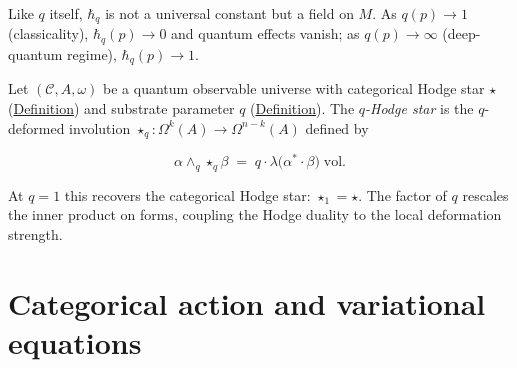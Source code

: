 \begin{remark}
  \label{rem:planck-limits}
Like $q$ itself, $\hbar_q$ is not a universal constant but a field on $M$.
As $q(p) \to 1$ (classicality), $\hbar_q(p) \to 0$ and quantum effects
vanish; as $q(p) \to \infty$ (deep-quantum regime), $\hbar_q(p) \to 1$.
\end{remark}

\begin{definition}
  \label{def:q-hodge-star}
Let $(\mathcal{C}, A, \omega)$ be a quantum observable universe with
categorical Hodge star $\star$
(\hyperref[def:categorical-hodge-star]{Definition}) and substrate
parameter $q$ (\hyperref[def:substrate-parameter]{Definition}).  The
\emph{$q$-Hodge star} is the $q$-deformed involution
$\star_q \colon \Omega^k(A) \to \Omega^{n-k}(A)$ defined by

\[
\alpha \wedge_q \star_q \beta
  \;=\; q \cdot \lambda\bigl(\alpha^* \cdot \beta\bigr)\;\mathrm{vol}.
\]

At $q = 1$ this recovers the categorical Hodge star:
$\star_1 = \star$.  The factor of $q$ rescales the inner product on
forms, coupling the Hodge duality to the local deformation strength.
\end{definition}

\section{Categorical action and variational equations}
\label{sec:categorical-action}

